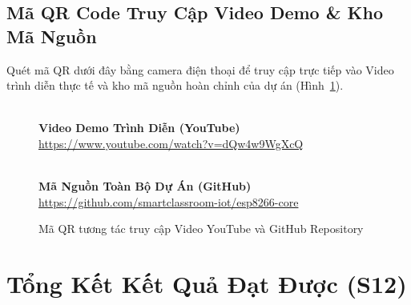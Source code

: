 \documentclass[12pt,a4paper]{article}
\begin{document}
\subsection{Mã QR Code Truy Cập Video Demo \& Kho Mã Nguồn}
Quét mã QR dưới đây bằng camera điện thoại để truy cập trực tiếp vào Video trình diễn thực tế và kho mã nguồn hoàn chỉnh của dự án (Hình~\ref{fig:qr_codes}).

\begin{figure}[htbp]
    \centering
    \begin{minipage}{0.45\textwidth}
        \centering
        \\[0.3cm]
        \textbf{Video Demo Trình Diễn (YouTube)}\\
        \small\url{https://www.youtube.com/watch?v=dQw4w9WgXcQ}
    \end{minipage}
    \hfill
    \begin{minipage}{0.45\textwidth}
        \centering
        \\[0.3cm]
        \textbf{Mã Nguồn Toàn Bộ Dự Án (GitHub)}\\
        \small\url{https://github.com/smartclassroom-iot/esp8266-core}
    \end{minipage}
    \caption{Mã QR tương tác truy cập Video YouTube và GitHub Repository}
    \label{fig:qr_codes}
\end{figure}

\newpage
\section{Tổng Kết Kết Quả Đạt Được (S12)}
\end{document}

